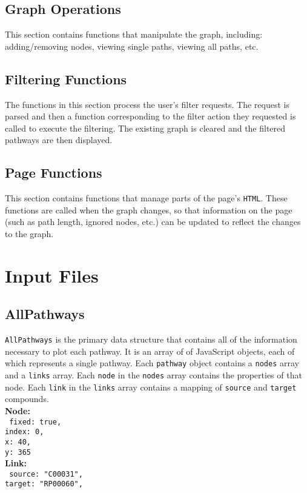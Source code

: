 \documentclass{article}
\begin{document}
			\subsection{Graph Operations}{
			This section contains functions that manipulate the graph, including: adding/removing nodes, viewing single paths, viewing all paths, etc.
			}
			
			\subsection{Filtering Functions}{
			The functions in this section process the user's filter requests. The request is parsed and then a function corresponding to the filter action they requested is called to execute the filtering. The existing graph is cleared and the filtered pathways are then displayed.
			}
			
			\subsection{Page Functions}{
			This section contains functions that manage parts of the page's \texttt{HTML}. These functions are called when the graph changes, so that information on the page (such as path length, ignored nodes, etc.) can be updated to reflect the changes to the graph.
			}
			
	
	
	
	\section{Input Files} %
		\label{sub:input_files}
			
			\subsection{AllPathways}
			\texttt{AllPathways} is the primary data structure that contains all of the information necessary to plot each pathway. It is an array of of JavaScript objects, each of which represents a single pathway. Each \texttt{pathway} object contains a \texttt{nodes} array and a \texttt{links} array. Each \texttt{node} in the \texttt{nodes} array contains the properties of that node. Each \texttt{link} in the \texttt{links} array contains a mapping of \texttt{source} and \texttt{target} compounds.\\
			
			\noindent \textbf{Node:}\\
				\texttt{
					\indent fixed: 	true,\\
					\indent index:	0,\\
					\indent x:	40,\\
					\indent y:	365\\
				}
			\noindent \textbf{Link:}\\
				\texttt{
					\indent source: "C00031",\\
					\indent target:	"RP00060",\\
				}
			
\end{document}
